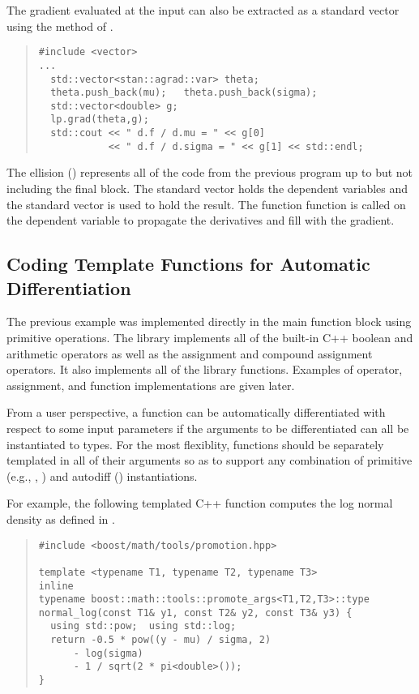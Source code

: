 \documentclass[10pt]{article}
\begin{document}
The gradient evaluated at the input can also be extracted as a
standard vector using the method  of .
%
\begin{quote}
\begin{Verbatim}
#include <vector>
...
  std::vector<stan::agrad::var> theta;
  theta.push_back(mu);   theta.push_back(sigma);
  std::vector<double> g;
  lp.grad(theta,g);
  std::cout << " d.f / d.mu = " << g[0]
            << " d.f / d.sigma = " << g[1] << std::endl;
\end{Verbatim}
\end{quote}
%
The ellision () represents all of the code from the previous
program up to but not including the final block.  The standard vector
 holds the dependent variables and the standard vector
 is used to hold the result.  The function 
function is called on the dependent variable to propagate the
derivatives and fill  with the gradient.

\subsection{Coding Template Functions for Automatic Differentiation}

The previous example was implemented directly in the main function
block using primitive operations.  The  library
implements all of the built-in C++ boolean and arithmetic operators
as well as the assignment and compound assignment operators.  
It also implements all of the library functions.  Examples of
operator, assignment, and function implementations are given later.

From a user perspective, a function can be automatically
differentiated with respect to some input parameters if the arguments
to be differentiated can all be instantiated to 
types.  For the most flexiblity, functions should be separately
templated in all of their arguments so as to support any combination
of primitive (e.g., , ) and autodiff
() instantiations.

For example, the following templated C++ function computes the log
normal density as defined in .
\begin{quote}
\begin{Verbatim}
#include <boost/math/tools/promotion.hpp>

template <typename T1, typename T2, typename T3>
inline
typename boost::math::tools::promote_args<T1,T2,T3>::type
normal_log(const T1& y1, const T2& y2, const T3& y3) {
  using std::pow;  using std::log;  
  return -0.5 * pow((y - mu) / sigma, 2)
      - log(sigma)
      - 1 / sqrt(2 * pi<double>());
}
\end{Verbatim}
\end{quote}
%
\end{document}
